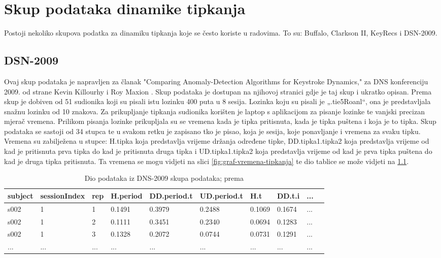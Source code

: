 \documentclass[]{foi}
\begin{document}
\chapter{Skup podataka dinamike tipkanja}
Postoji nekoliko skupova podatka za dinamiku tipkanja koje se često koriste u radovima. To su: Buffalo, Clarkson II, KeyRecs i DSN-2009.

\section{DSN-2009}

Ovaj skup podataka je napravljen za članak "Comparing Anomaly-Detection Algorithms for Keystroke Dynamics,"  za DNS konferenciju 2009. od strane Kevin Killourhy i Roy Maxion \cite{DNS}. Skup podataka je dostupan na njihovoj stranici \cite{DNS} gdje je taj skup i ukratko opisan. Prema \cite{DNS} skup je dobiven od 51 sudionika koji su pisali istu lozinku 400 puta u 8 sesija. Lozinka koju su pisali je „.tie5Roanl“, ona je predstavljala snažnu lozinku od 10 znakova. Za prikupljanje tipkanja sudionika korišten je laptop s aplikacijom za pisanje lozinke te vanjski precizan mjerač vremena. Prilikom pisanja lozinke prikupljala su se vremena kada je tipka pritisnuta, kada je tipka puštena i koja je to tipka. Skup podataka se sastoji od 34 stupca te u svakom retku je zapisano tko je pisao, koja je sesija, koje ponavljanje i vremena za svaku tipku. Vremena su zabilježena u stupce: H.tipka koja predstavlja vrijeme držanja određene tipke, DD.tipka1.tipka2 koja predstavlja vrijeme od kad je pritisnuta prva tipka do kad je pritisnuta druga tipka i UD.tipka1.tipka2 koja predstavlja vrijeme od kad je prva tipka puštena do kad je druga tipka pritisnuta. Ta vremena se mogu vidjeti na slici \ref{fig:graf-vremena-tipkanja} te dio tablice se može vidjeti na \ref{tab:DNS-podaci}.

\begin{table}[!h]
    \centering
    \caption{Dio podataka iz DNS-2009 skupa podataka; prema \cite{DNS}}
    \begin{tabularx}{1\textwidth}{|l|l|l|l|l|l|l|l|l|l|}
    \hline
        \cellcolor{gray!25}subject & \cellcolor{gray!25}sessionIndex & \cellcolor{gray!25}rep & \cellcolor{gray!25}H.period & \cellcolor{gray!25}DD.period.t & \cellcolor{gray!25}UD.period.t & \cellcolor{gray!25}H.t & \cellcolor{gray!25}DD.t.i & \cellcolor{gray!25}... \\ \hline
        s002 & 1 & 1 & 0.1491 & 0.3979 & 0.2488 & 0.1069 & 0.1674 & ... \\ \hline
        s002 & 1 & 2 & 0.1111 & 0.3451 & 0.2340 & 0.0694 & 0.1283 & ... \\ \hline
        s002 & 1 & 3 & 0.1328 & 0.2072 & 0.0744 & 0.0731 & 0.1291 & ... \\ \hline
        ... & ... & ... & ... & ... & ... & ... & ... & ... \\ \hline
    \end{tabularx}
    \\[10pt]
    \label{tab:DNS-podaci}
\end{table}
\end{document}
